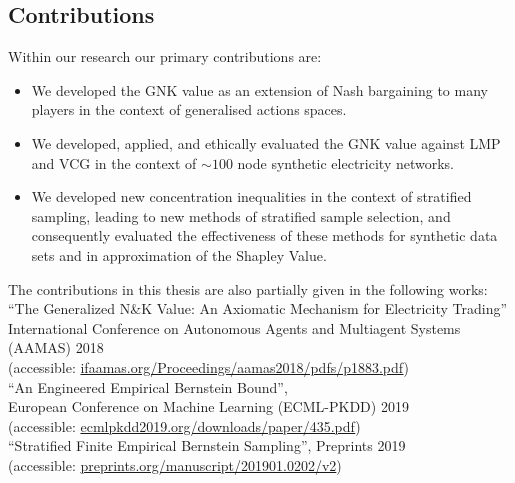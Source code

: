 \subsection{Contributions}

Within our research our primary contributions are:
\begin{itemize}
\item We developed the GNK value as an extension of Nash bargaining to many players in the context of generalised actions spaces.
\item We developed, applied, and ethically evaluated the GNK value against LMP and VCG in the context of $\sim 100$ node synthetic electricity networks.
\item We developed new concentration inequalities in the context of stratified sampling, leading to new methods of stratified sample selection, and consequently evaluated the effectiveness of these methods for synthetic data sets and in approximation of the Shapley Value.
\end{itemize}

\noindent The contributions in this thesis are also partially given in the following works:\\

\noindent``The Generalized N\&K Value: An Axiomatic Mechanism for Electricity Trading''\\ International Conference on Autonomous Agents and Multiagent Systems\\ (AAMAS) 2018\\
(accessible: \href{ifaamas.org/Proceedings/aamas2018/pdfs/p1883.pdf}{ifaamas.org/Proceedings/aamas2018/pdfs/p1883.pdf})\\


\noindent``An Engineered Empirical Bernstein Bound'',\\ European Conference on Machine Learning (ECML-PKDD) 2019\\
(accessible: \href{http://ecmlpkdd2019.org/downloads/paper/435.pdf}{ecmlpkdd2019.org/downloads/paper/435.pdf})\\


\noindent``Stratified Finite Empirical Bernstein Sampling'', Preprints 2019\\
(accessible: \href{preprints.org/manuscript/201901.0202/v2}{preprints.org/manuscript/201901.0202/v2})

